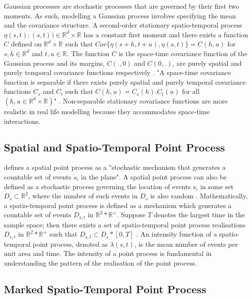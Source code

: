 Gaussian processes are stochastic processes that are governed by their first two moments. As such, modelling a Gaussian process involves specifying the mean and the covariance structure. A second-order stationary spatio-temporal process ${\eta(s,t):(s,t))\in \mathbb{R}^d \times \mathbb{R}}$ has a constant first moment and there exists a function $C$ defined on $\mathbb{R}^d \times \mathbb{R}$ such that $Cov \lbrace \eta(s+h,t+u), \eta(s,t)\rbrace = C(h,u)$ for $s,h \in \mathbb{R}^d$ and $t,u \in \mathbb{R}$. The function $C$ is the space-time covariance function of the Gaussian process and its margins, $C(.,0)$ and $C(0,.)$, are purely spatial and purely temporal covariance functions respectively \citep{Gelfand:2010}. "A space-time covariance function is separable if there exists purely spatial and purely temporal covariance functions $C_s$ and $C_t$ such that $C(h,u) = C_s(h) . C_t(u)$ for all $(h,u \in \mathbb{R}^d \times \mathbb{R})$" \citep{Gelfand:2010}. Non-separable stationary covariance functions are more realistic in real life modelling because they accommodates space-time interactions.

\subsection{Spatial and Spatio-Temporal Point Process} \label{2.3.2}

\citet{Diggle:2013} defines a spatial point process as a "stochastic mechanism that generates a countable set of events $s_i$ in the plane". A spatial point process can also be defined as a stochastic process governing the location of events ${s_i}$ in some set $D_s \subset \mathbb{R}^2$, where the number of such events in $D_s$ is also random \citep{Cressie:2015}. Mathematically, a spatio-temporal point process is defined as a mechanism which generates a countable set of events $D_{s,t}$ in  $\mathbb{R}^2 * \mathbb{R^+}$. Suppose $T$ denotes the largest time in the sample space; then there exists a set of spatio-temporal point process realisations $D_{s,t}$ in  $\mathbb{R}^2 * \mathbb{R^+}$ such that $D_{s,t} \subset D_s * [0,T]$ \citep{Cressie:2015}. An intensity function of a spatio-temporal point process, denoted as $\lambda (s,t)$, is the mean number of events per unit area and time. The intensity of a point process is fundamental in understanding the pattern of the realisation of the point process.

\subsection{Marked Spatio-Temporal Point Process} \label{2.3.3}

